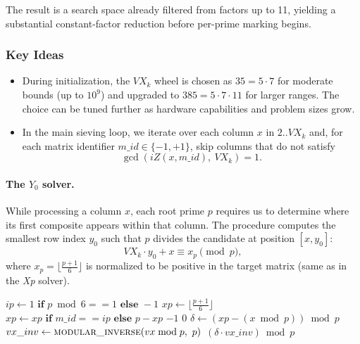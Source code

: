 \documentclass{article}
\begin{document}
The result is a search space already filtered from factors up to 11, yielding a substantial constant-factor reduction before per-prime marking begins.

\subsubsection*{Key Ideas}
\begin{itemize}
    \item During initialization, the $VX_k$ wheel is chosen as $35 = 5 \cdot 7$ for moderate bounds (up to $10^9$) and upgraded to $385 = 5 \cdot 7 \cdot 11$ for larger ranges. The choice can be tuned further as hardware capabilities and problem sizes grow.
    \item In the main sieving loop, we iterate over each column $x$ in $2..VX_k$ and, for each matrix identifier $m\_id \in \{-1, +1\}$, skip columns that do not satisfy
    \[\gcd(iZ(x, m\_id),\ VX_k) = 1.\]
\end{itemize}

\paragraph{The $Y_0$ solver.}
While processing a column $x$, each root prime $p$ requires us to determine where its first composite appears within that column. The  procedure computes the smallest row index $y_0$ such that $p$ divides the candidate at position $[x, y_0]$:
\[
VX_k\cdot y_0 + x \equiv x_p \pmod p,
\]
where $x_p = \lfloor\tfrac{p+1}{6}\rfloor$ is normalized to be positive in the target matrix (same as in the \emph{Xp} solver).

\begin{algorithmic}[1]
        \State $ip \gets 1 \textbf{ if } p \bmod 6 == 1 \textbf{ else } -1$
        \State $xp \gets \lfloor\tfrac{p + 1}{6}\rfloor$
        \State $xp \gets xp \textbf{ if } m\_id == ip \textbf{ else } p - xp$ 
            \State \Return $-1$ 
        \EndIf
            \State \Return $0$
        \EndIf
        \State $\delta \gets (xp - (x \bmod p)) \bmod p$
        \State $vx\_inv \gets \Call{modular\_inverse}{vx \bmod p,\ p}$
        \State \Return $(\delta \cdot vx\_inv) \bmod p$
    \EndProcedure
\end{algorithmic}
\end{document}
